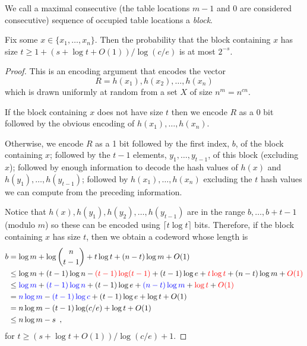 \documentclass[lotsofwhite]{patmorin}
\begin{document}
We call a maximal consecutive (the table locations $m-1$ and
$0$ are considered consecutive) sequence of occupied table locations
a \emph{block}.

\begin{thm}
  Fix some $x\in\{x_1,\ldots,x_n\}$. Then the probability that the block
  containing $x$ has size $t\ge 1+(s+\log t + O(1))/\log(c/e)$ is at most $2^{-s}$.
\end{thm}

\begin{proof}
  This is an encoding argument that encodes the vector 
  \[
     R = h(x_1),h(x_2),\ldots,h(x_n)
  \]
  which is drawn uniformly at random from a set $X$ of size $n^{m}=n^{cn}$.
  
  If the block containing $x$ does not have size $t$ then we encode $R$
  as a 0 bit followed by the obvious encoding of $h(x_1),\ldots,h(x_n)$.
  
  Otherwise, we encode $R$ as a 1 bit followed by the first index,
  $b$, of the block containing $x$; followed by the $t-1$ elements,
  $y_1,\ldots,y_{t-1}$, of this block (excluding $x$); followed
  by enough information to decode the hash values of $h(x)$ and
  $h(y_1),\ldots,h(y_{t-1})$; followed by $h(x_1),\ldots,h(x_n)$ excluding
  the $t$ hash values we can compute from the preceding information.

  Notice that $h(x),h(y_1),h(y_2),\ldots,h(y_{t-1})$ are in the range
  $b,\ldots,b+t-1$ (modulo $m$) so these can be encoded using $\lceil
  t\log t\rceil$ bits.  Therefore, if the block containing $x$ has size $t$,
  then we obtain a codeword whose length is
  \begin{align*}
    b & = \log m + \log\binom{n}{t-1} + t\log t + (n-t)\log m + O(1) \\
       & \le \log m + (t-1)\log n - 
           {\color{red}(t-1)\log(t-1)} + (t-1)\log e + {\color{red}t\log t} + (n-t)\log m + {\color{red}O(1)}\\
       & \le {\color{blue}\log m} + {\color{blue}(t-1)\log n} + (t-1)\log e + {\color{blue}(n-t)\log m} + {\color{red}\log t}+ {\color{red} O(1)}\\
       & = {\color{blue}n\log m} - {\color{blue}(t-1)\log c} + (t-1)\log e + \log t + O(1) \\
       & = n\log m - (t-1)\log(c/e) + \log t + O(1) \\
       & \le n\log m - s \enspace ,
  \end{align*}
  for $t\ge (s+\log t+O(1))/\log (c/e) + 1$.
\end{proof}
\end{document}
